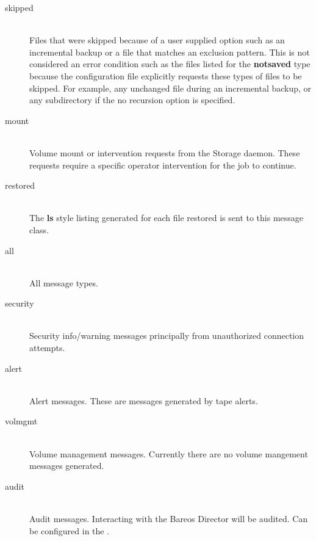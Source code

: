 \begin{description}
\begin{description}
\item [skipped] \hfill \\
Files that were skipped because of a user supplied option such as an
incremental backup or a file that matches an exclusion pattern.  This is
not considered an error condition such as the files listed for the {\bf
notsaved} type because the configuration file explicitly requests these
types of files to be skipped.  For example, any unchanged file during an
incremental backup, or any subdirectory if the no recursion option is
specified.

\item [mount] \hfill \\
Volume mount or intervention requests from the Storage daemon.  These
requests require a specific operator intervention for the job to
continue.

\item [restored] \hfill \\
The {\bf ls} style listing generated for each file restored is sent to
this message class.

\item [all] \hfill \\
All message types.

\item [security] \hfill \\
Security info/warning messages principally from unauthorized
connection attempts.

\item [alert] \hfill \\
Alert messages. These are messages generated by tape alerts.

\item [volmgmt] \hfill \\
Volume management messages. Currently there are no volume mangement
messages generated.

\item [audit] \hfill \\
Audit messages. Interacting with the Bareos Director will be audited.
Can be configured in the .

\end{description}

\end{description}

